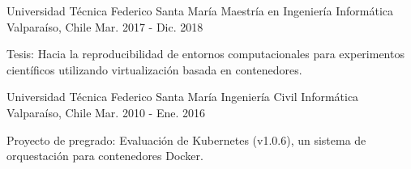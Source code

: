 \begin{cventries}
\cventry
{Universidad Técnica Federico Santa María}
{Maestría en Ingeniería Informática}
{Valparaíso, Chile}
{Mar. 2017 - Dic. 2018}
{
\begin{cvitems}
\item{Tesis: Hacia la reproducibilidad de entornos computacionales para experimentos científicos utilizando virtualización basada en contenedores.}
\end{cvitems}
}
\cventry
{Universidad Técnica Federico Santa María}
{Ingeniería Civil Informática}
{Valparaíso, Chile}
{Mar. 2010 - Ene. 2016}
{
\begin{cvitems}
\item {Proyecto de pregrado: Evaluación de Kubernetes (v1.0.6), un sistema de orquestación para contenedores Docker.}
\end{cvitems}
}
\end{cventries}